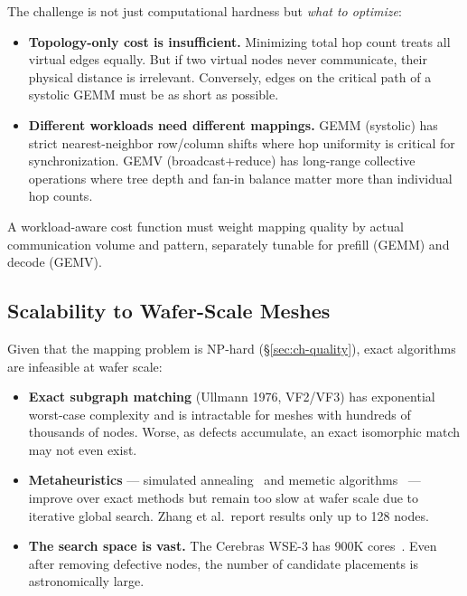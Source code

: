 \documentclass[sigplan,anonymous,review,nonacm]{acmart}
\begin{document}
The challenge is not just computational hardness but \emph{what to optimize}:
\begin{itemize}
\item \textbf{Topology-only cost is insufficient.} Minimizing total hop count treats all virtual edges equally. But if two virtual nodes never communicate, their physical distance is irrelevant. Conversely, edges on the critical path of a systolic GEMM must be as short as possible.
\item \textbf{Different workloads need different mappings.} GEMM (systolic) has strict nearest-neighbor row/column shifts where hop uniformity is critical for synchronization. GEMV (broadcast+reduce) has long-range collective operations where tree depth and fan-in balance matter more than individual hop counts.
\end{itemize}

A workload-aware cost function must weight mapping quality by actual communication volume and pattern, separately tunable for prefill (GEMM) and decode (GEMV).

\subsection{Scalability to Wafer-Scale Meshes}
\label{sec:ch-scalability}

Given that the mapping problem is NP-hard (\S\ref{sec:ch-quality}), exact algorithms are infeasible at wafer scale:

\begin{itemize}
\item \textbf{Exact subgraph matching} (Ullmann 1976, VF2/VF3) has exponential worst-case complexity and is intractable for meshes with hundreds of thousands of nodes. Worse, as defects accumulate, an exact isomorphic match may not even exist.

\item \textbf{Metaheuristics} --- simulated annealing~\cite{zhang2009topology} and memetic algorithms~\cite{qian2024memetic} --- improve over exact methods but remain too slow at wafer scale due to iterative global search. Zhang et al.\ report results only up to 128 nodes.

\item \textbf{The search space is vast.} The Cerebras WSE-3 has 900K cores~\cite{lie2023cerebras}. Even after removing defective nodes, the number of candidate placements is astronomically large.
\end{itemize}
\end{document}
